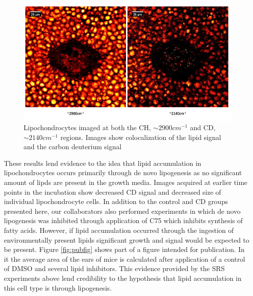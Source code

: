 \begin{figure}
    \centering
    \includegraphics[width=\linewidth]{Figures/comparison.png}
    \caption{Lipochondrocytes imaged at both the CH, $\sim2900cm^{-1}$ and CD, $\sim2140cm^{-1}$ regions.  Images show colocalization of the lipid signal and the carbon deuterium signal}
    \label{fig:compare}
\end{figure}

These results lend evidence to the idea that lipid accumulation in lipochondrocytes occurs primarily through de novo lipogenesis as no significant amount of lipds are present in the growth media.  Images acquired at earlier time points in the incubation show decreased CD signal and decreased size of individual lipochondrocyte cells.  In addition to the control and CD groups presented here, our collaborators also performed experiments in which de novo lipogenesis was inhibited through application of C75 which inhibits synthesis of fatty acids. However, if lipid accumulation occurred through the ingestion of environmentally present lipids significant growth and signal would be expected to be present. Figure \ref{fig:pubfig} shows part of a figure intended for publication.  In it the average area of the ears of mice is calculated after application of a control of DMSO and several lipid inhibitors.  This evidence provided by the SRS experiments above lend credibility to the hypothesis that lipid accumulation in this cell type is through lipogenesis.


